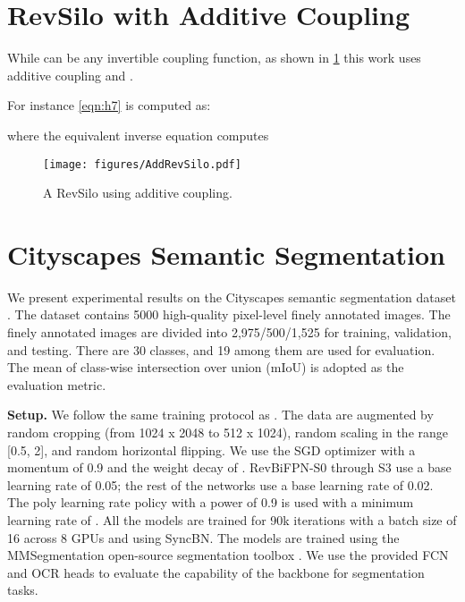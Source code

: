 \documentclass{article}
\begin{document}
\section{RevSilo with Additive Coupling}
\label{appx:a_revsilo}

While  can be any invertible coupling function,
as shown in \cref{fig:a_silo}
this work uses additive coupling and .

For instance \cref{eqn:h7} is computed as:

where the equivalent inverse equation computes


\begin{figure}[h]
    \centering
    \texttt{[image: figures/AddRevSilo.pdf]}
    \caption{A RevSilo using additive coupling.}
    \label{fig:a_silo}
\end{figure}




\section{Cityscapes Semantic Segmentation}
\label{sec:exp:seg}

We present experimental results on the Cityscapes semantic segmentation dataset \cite{cordts2016cityscapes}.
The dataset contains 5000 high-quality pixel-level finely annotated images.
The finely annotated images are divided into 2,975/500/1,525 for training, validation, and testing.
There are 30 classes, and 19 among them are used for evaluation.
The mean of class-wise intersection over union (mIoU) is adopted as the evaluation metric.

\textbf{Setup.}
We follow the same training protocol as \citet{zhao2017pyramid,zhao2018psanet}.
The data are augmented by random cropping (from 1024 x 2048 to 512 x 1024), random scaling in the range [0.5, 2], and random horizontal flipping.
We use the SGD optimizer with a momentum of 0.9 and the weight decay of .
RevBiFPN-S0 through S3 use a base learning rate of 0.05; the rest of the networks use a base learning rate of 0.02.
The poly learning rate policy with a power of 0.9 is used with a minimum learning rate of .
All the models are trained for 90k iterations with a batch size of 16 across 8 GPUs and using SyncBN.
The models are trained using the MMSegmentation open-source segmentation toolbox \cite{mmseg2020}.
We use the provided FCN and OCR heads to evaluate the capability of the backbone for segmentation tasks.
\end{document}
